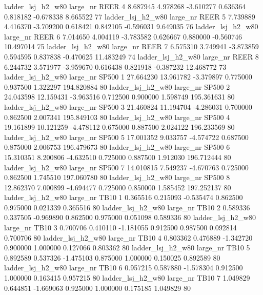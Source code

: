   ladder_lsj_h2_w80   large_nr     REER                 4  8.687945  4.978268  -3.610277 0.636364 0.818182 -0.678338    8.665522 77
  ladder_lsj_h2_w80   large_nr     REER                 5  7.739889  4.416370  -3.709200 0.618421 0.842105 -0.596031    9.649035 76
  ladder_lsj_h2_w80   large_nr     REER                 6  7.014650  4.004119  -3.783582 0.626667 0.880000 -0.560746   10.497014 75
  ladder_lsj_h2_w80   large_nr     REER                 7  6.575310  3.749941  -3.873859 0.594595 0.837838 -0.470625   11.483249 74
  ladder_lsj_h2_w80   large_nr     REER                 8  6.244732  3.571977  -3.959670 0.616438 0.821918 -0.387232   12.468772 73
  ladder_lsj_h2_w80   large_nr    SP500                 1 27.664230 13.961782  -3.379897 0.775000 0.937500  1.322297  194.820884 80
  ladder_lsj_h2_w80   large_nr    SP500                 2 24.043598 12.159431  -3.963516 0.712500 0.900000  1.598749  195.361631 80
  ladder_lsj_h2_w80   large_nr    SP500                 3 21.460824 11.194704  -4.286031 0.700000 0.862500  2.007341  195.849103 80
  ladder_lsj_h2_w80   large_nr    SP500                 4 19.161899 10.121259  -4.478112 0.675000 0.887500  2.024122  196.233569 80
  ladder_lsj_h2_w80   large_nr    SP500                 5 17.001352  9.033757  -4.574722 0.687500 0.875000  2.006753  196.479673 80
  ladder_lsj_h2_w80   large_nr    SP500                 6 15.310351  8.200806  -4.632510 0.725000 0.887500  1.912030  196.712444 80
  ladder_lsj_h2_w80   large_nr    SP500                 7 14.010815  7.549237  -4.670763 0.725000 0.862500  1.745510  197.060780 80
  ladder_lsj_h2_w80   large_nr    SP500                 8 12.862370  7.000899  -4.694477 0.725000 0.850000  1.585452  197.252137 80
  ladder_lsj_h2_w80   large_nr     TB10                 1  0.365516  0.215093  -0.535474 0.862500 0.975000  0.021339    0.365516 80
  ladder_lsj_h2_w80   large_nr     TB10                 2  0.589336  0.337505  -0.969890 0.862500 0.975000  0.051098    0.589336 80
  ladder_lsj_h2_w80   large_nr     TB10                 3  0.700706  0.410110  -1.181055 0.912500 0.987500  0.092814    0.700706 80
  ladder_lsj_h2_w80   large_nr     TB10                 4  0.803362  0.476889  -1.342720 0.900000 1.000000  0.127066    0.803362 80
  ladder_lsj_h2_w80   large_nr     TB10                 5  0.892589  0.537326  -1.475103 0.875000 1.000000  0.150025    0.892589 80
  ladder_lsj_h2_w80   large_nr     TB10                 6  0.957215  0.587880  -1.578304 0.912500 1.000000  0.163415    0.957215 80
  ladder_lsj_h2_w80   large_nr     TB10                 7  1.049829  0.644851  -1.669063 0.925000 1.000000  0.175185    1.049829 80
